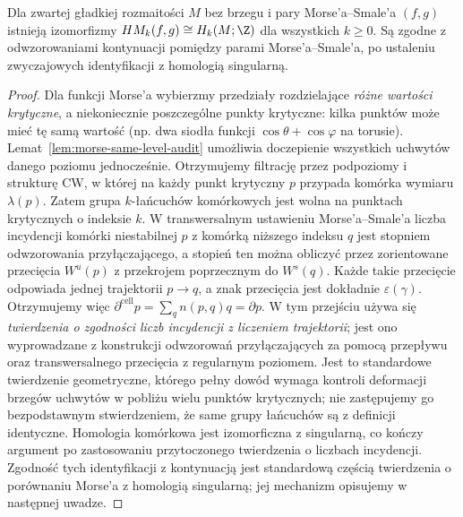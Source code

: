 \begin{twierdzenie}
\label{thm:morse-singular-v10}
Dla zwartej gładkiej rozmaitości $M$ bez brzegu i pary
Morse'a--Smale'a $(f,g)$ istnieją izomorfizmy
$HM_k(f,g)\cong H_k(M;\Z)$ dla wszystkich $k\ge0$.
Są zgodne z odwzorowaniami kontynuacji pomiędzy
parami Morse'a--Smale'a, po ustaleniu zwyczajowych
identyfikacji z homologią singularną.
\end{twierdzenie}
\begin{proof}
Dla funkcji Morse'a wybierzmy przedziały rozdzielające
\emph{różne wartości krytyczne}, a niekoniecznie poszczególne
punkty krytyczne: kilka punktów może mieć tę samą wartość
(np. dwa siodła funkcji $\cos\theta+\cos\varphi$ na torusie).
Lemat~\ref{lem:morse-same-level-audit} umożliwia doczepienie
wszystkich uchwytów danego poziomu jednocześnie. Otrzymujemy
filtrację przez podpoziomy i strukturę CW, w której na każdy
punkt krytyczny $p$ przypada komórka wymiaru $\lambda(p)$.
Zatem grupa $k$-łańcuchów komórkowych jest wolna na punktach
krytycznych o indeksie $k$.
W transwersalnym ustawieniu Morse'a--Smale'a liczba
incydencji komórki niestabilnej $p$ z komórką
niższego indeksu $q$ jest stopniem odwzorowania przyłączającego,
a stopień ten można obliczyć przez zorientowane przecięcia
$W^u(p)$ z przekrojem poprzecznym do $W^s(q)$.
Każde takie przecięcie odpowiada jednej trajektorii
$p\to q$, a znak przecięcia jest dokładnie
$\varepsilon(\gamma)$. Otrzymujemy więc
$\partial^{\mathrm{cell}}p=\sum_qn(p,q)q=\partial p$.
W tym przejściu używa się \emph{twierdzenia o zgodności
liczb incydencji z liczeniem trajektorii}; jest ono
wyprowadzane z konstrukcji odwzorowań przyłączających za pomocą przepływu
oraz transwersalnego przecięcia z regularnym poziomem.
Jest to standardowe twierdzenie geometryczne, którego
pełny dowód wymaga kontroli deformacji brzegów
uchwytów w pobliżu wielu punktów krytycznych; nie
zastępujemy go bezpodstawnym stwierdzeniem, że
same grupy łańcuchów są z definicji identyczne.
Homologia komórkowa jest izomorficzna z singularną,
co kończy argument po zastosowaniu przytoczonego
twierdzenia o liczbach incydencji.
Zgodność tych identyfikacji z kontynuacją
jest standardową częścią twierdzenia o porównaniu
Morse'a z homologią singularną; jej mechanizm
opisujemy w następnej uwadze.
\end{proof}

